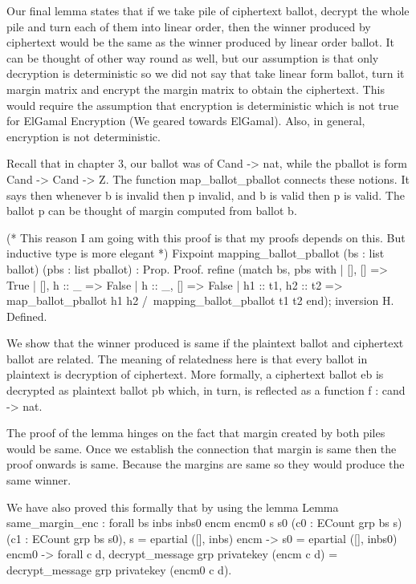 Our final lemma states that if we take pile of ciphertext ballot, decrypt the whole pile and turn each of 
 them into linear order, then the winner produced by ciphertext would be the same as the winner produced 
 by linear order ballot. It can be thought of other way round as well, but our assumption is that 
 only decryption is deterministic so we did not say that take linear form ballot, turn it margin 
 matrix and encrypt the margin matrix to obtain the ciphertext. This would require the assumption that 
 encryption is deterministic which is not true for ElGamal Encryption (We geared towards ElGamal). 
 Also, in general, encryption is not deterministic. 
 
 
    
Recall that in chapter 3, our ballot was of Cand -> nat, while the pballot is form Cand -> Cand -> Z. 
The function map_ballot_pballot connects these notions. It says then whenever b is invalid then p invalid, 
and b is valid then p is valid. The ballot p can be thought of margin computed from ballot b. 
    
    (* This reason I am going with this proof is that my proofs depends on this. 
       But inductive type is more elegant *)
    Fixpoint mapping_ballot_pballot (bs : list ballot) (pbs : list pballot) : Prop. 
    Proof.
      refine (match bs, pbs with
              | [], [] => True
              | [], h :: _ => False 
              | h :: _, [] => False
              | h1 :: t1, h2 :: t2 =>
                map_ballot_pballot h1 h2 /\
                 mapping_ballot_pballot t1 t2
              end); inversion H.
    Defined.
    
 
We show that the winner produced is same if the plaintext ballot and ciphertext ballot are related.  The meaning 
of relatedness here is that every ballot in plaintext is decryption of ciphertext. More formally, a ciphertext ballot 
eb is decrypted as plaintext ballot pb which, in turn, is reflected as a function f : cand -> nat. 

The proof of the lemma hinges on the fact that margin created by both piles would be same.  Once we establish 
the connection that margin is same then the proof onwards is same. Because the margins are same so they would produce the 
same winner. 

We have also proved this formally that by using the lemma 
Lemma same_margin_enc :
      forall bs inbs inbs0 encm encm0 s s0 (c0 : ECount grp bs s) (c1 :  ECount grp bs s0),  
        s = epartial ([], inbs) encm ->
        s0 = epartial ([], inbs0) encm0 ->
        forall c d, decrypt_message grp privatekey (encm c d) =
               decrypt_message grp privatekey (encm0 c d). 
               
